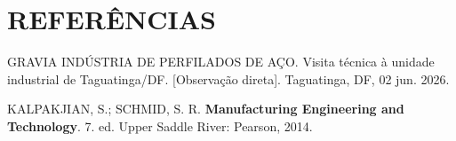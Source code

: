 \documentclass[12pt,a4paper,oneside,brazil,chapter=TITLE]{article}
\newcommand{\secbreak}{\clearpage}
\let\oldsection\section
\renewcommand{\section}{\secbreak\oldsection}
\begin{document}
\section{REFERÊNCIAS}\label{referencias}

GRAVIA INDÚSTRIA DE PERFILADOS DE AÇO. Visita técnica à unidade industrial de Taguatinga/DF. [Observação direta]. Taguatinga, DF, 02 jun. 2026.

KALPAKJIAN, S.; SCHMID, S. R. \textbf{Manufacturing Engineering and Technology}. 7. ed. Upper Saddle River: Pearson, 2014.
\end{document}
